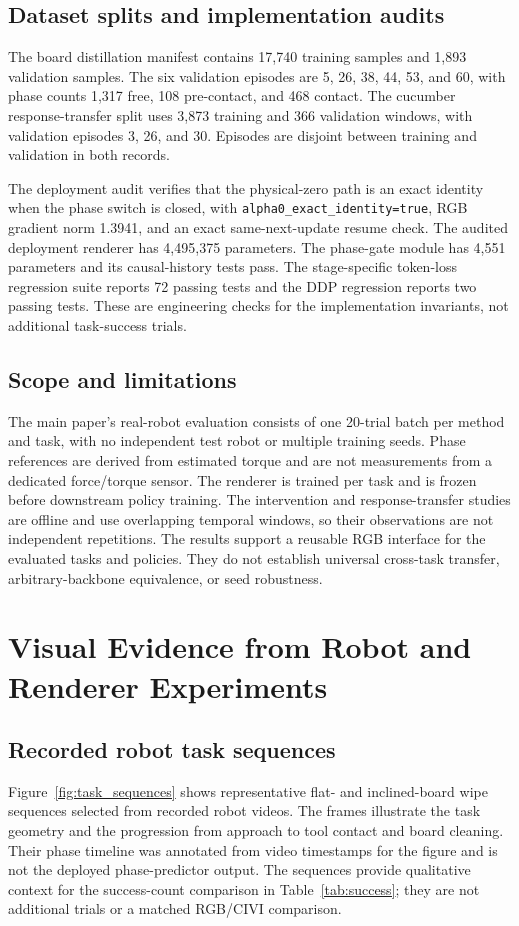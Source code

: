 \documentclass[10pt,twocolumn,letterpaper]{article}
\begin{document}
\subsection{Dataset splits and implementation audits}
The board distillation manifest contains 17,740 training samples and 1,893
validation samples. The six validation episodes are 5, 26, 38, 44, 53, and
60, with phase counts 1,317 free, 108 pre-contact, and 468 contact. The
cucumber response-transfer split uses 3,873 training and 366 validation
windows, with validation episodes 3, 26, and 30. Episodes are disjoint between
training and validation in both records.

The deployment audit verifies that the physical-zero path is an exact identity
when the phase switch is closed, with
\texttt{alpha0\_exact\_identity=true}, RGB
gradient norm 1.3941, and an exact same-next-update resume check. The audited
deployment renderer has 4,495,375 parameters. The phase-gate module has 4,551
parameters and its causal-history tests pass. The stage-specific token-loss
regression suite reports 72 passing tests and the DDP regression reports two
passing tests. These are engineering checks for the implementation invariants,
not additional task-success trials.

\subsection{Scope and limitations}
The main paper's real-robot evaluation consists of one 20-trial batch per method and task,
with no independent test robot or multiple training seeds. Phase references
are derived from estimated torque and are not measurements from a dedicated
force/torque sensor. The renderer is trained per task and is frozen before
downstream policy training. The intervention and response-transfer studies
are offline and use overlapping temporal windows, so their observations are
not independent repetitions. The results support a reusable RGB interface for
the evaluated tasks and policies. They do not establish universal cross-task
transfer, arbitrary-backbone equivalence, or seed robustness.

\section{Visual Evidence from Robot and Renderer Experiments}
\label{sec:visual_evidence}

\subsection{Recorded robot task sequences}
Figure~\ref{fig:task_sequences} shows representative flat- and inclined-board
wipe sequences selected from recorded robot videos. The frames illustrate the
task geometry and the progression from approach to tool contact and board
cleaning. Their phase timeline was annotated from video timestamps for the
figure and is not the deployed phase-predictor output. The sequences provide
qualitative context for the success-count comparison in
Table~\ref{tab:success}; they are not additional trials or a matched RGB/CIVI
comparison.
\end{document}
